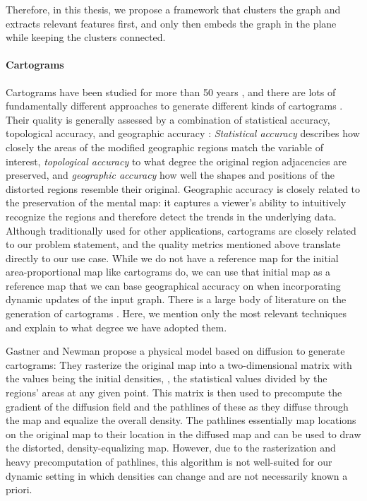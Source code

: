 Therefore, in this thesis, we propose a framework that clusters the graph and extracts relevant features first, and only then embeds the graph in the plane while keeping the clusters connected.


\paragraph{Cartograms}

Cartograms have been studied for more than 50 years \cite{tobler2004thirty}, and there are lots of fundamentally different approaches to generate different kinds of cartograms \cite{nusrat2016state}.
Their quality is generally assessed by a combination of statistical accuracy, topological accuracy, and geographic accuracy \cite{alam2015quantitative}: \emph{Statistical accuracy} describes how closely the areas of the modified geographic regions match the variable of interest, \emph{topological accuracy} to what degree the original region adjacencies are preserved, and \emph{geographic accuracy} how well the shapes and positions of the distorted regions resemble their original.
Geographic accuracy is closely related to the preservation of the mental map: it captures a viewer's ability to intuitively recognize the regions and therefore detect the trends in the underlying data.
Although traditionally used for other applications, cartograms are closely related to our problem statement, and the quality metrics mentioned above translate directly to our use case.
While we do not have a reference map for the initial area-proportional map like cartograms do, we can use that initial map as a reference map that we can base geographical accuracy on when incorporating dynamic updates of the input graph.
There is a large body of literature on the generation of cartograms \cite{tobler2004thirty} \cite{alam2015quantitative} \cite{nusrat2016state}.
Here, we mention only the most relevant techniques and explain to what degree we have adopted them.

Gastner and Newman \cite{gastner2004diffusion} propose a physical model based on diffusion to generate cartograms:
They rasterize the original map into a two-dimensional matrix with the values being the initial densities, \ie{}, the statistical values divided by the regions' areas at any given point.
This matrix is then used to precompute the gradient of the diffusion field and the pathlines of these  as they diffuse through the map and equalize the overall density.
The pathlines essentially map locations on the original map to their location in the diffused map and can be used to draw the distorted, density-equalizing map.
However, due to the rasterization and heavy precomputation of pathlines, this algorithm is not well-suited for our dynamic setting in which densities can change and are not necessarily known a priori.

